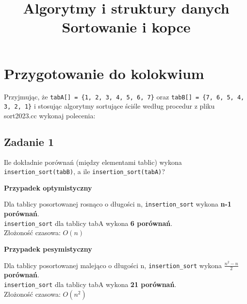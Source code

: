 \documentclass{article}
\title {
    \Huge\textbf{Algorytmy i struktury danych} \\
    \vspace{2mm}
    \huge{Sortowanie i kopce} 
    \date{}
}
\begin{document}
    \maketitle
    \boldmath
    \section*{Przygotowanie do kolokwium}
    Przyjmując, że \verb+tabA[] = {1, 2, 3, 4, 5, 6, 7}+ oraz \verb+tabB[] = {7, 6, 5, 4, 3, 2, 1}+ i stosując algorytmy
    sortujące ściśle według procedur z pliku sort2023.cc wykonaj polecenia:

    \subsection*{Zadanie 1}
    Ile dokładnie porównań (między elementami tablic) wykona \verb+insertion_sort(tabB)+, a ile \verb+insertion_sort(tabA)+?

    \begin{center}
        \textbf{Przypadek optymistyczny}
        \begin{center}
            Dla tablicy posortowanej rosnąco o długości n, \verb+insertion_sort+ wykona \textbf{n-1 porównań}. \\
            \verb+insertion_sort+ dla tablicy tabA wykona \textbf{6 porównań}. \\ 
            Złożoność czasowa: $O(n)$
        \end{center}

        \textbf{Przypadek pesymistyczny}
        \begin{center}
            Dla tablicy posortowanej malejąco o długości n, \verb+insertion_sort+ wykona $\frac{n^2 - n}{2}$ \textbf{porównań}. \\ 
            \verb+insertion_sort+ dla tablicy tabA wykona \textbf{21 porównań}. \\
            Złożoność czasowa: $O(n^2)$
        \end{center}
    \end{center}
\end{document}

